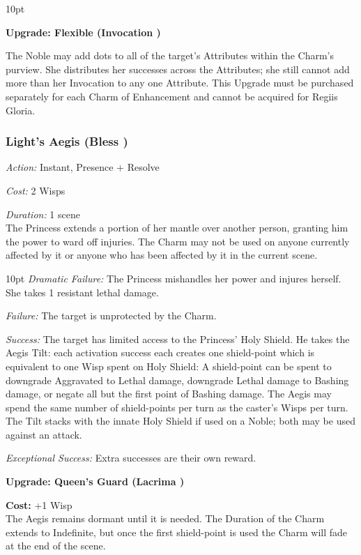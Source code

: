 \begin{myindentpar}{10pt} 

\textbf{Upgrade: Flexible (Invocation \textbullet\textbullet\textbullet)}

The Noble may add dots to all of the target’s Attributes within the Charm's purview. She distributes her successes across the Attributes; she still cannot add more than her Invocation to any one Attribute. This Upgrade must be purchased separately for each Charm of Enhancement and cannot be acquired for Regiis Gloria. 

\end{myindentpar}

\subsubsection*{Light’s Aegis (Bless \textbullet\textbullet\textbullet)}

\emph{Action:} Instant, Presence + Resolve

\emph{Cost:} 2 Wisps

\emph{Duration:} 1 scene \\

\noindent The Princess extends a portion of her mantle over another person, granting him the power to ward off injuries. The Charm may not be used on anyone currently affected by it or anyone who has been affected by it in the current scene. 

\begin{myindentpar}{10pt}    \emph{Dramatic Failure:} The Princess mishandles her power and injures herself. She takes 1 resistant lethal damage.

\emph{Failure:} The target is unprotected by the Charm. 

\emph{Success:} The target has limited access to the Princess’ Holy Shield. He takes the Aegis Tilt: each activation success each creates one shield-point which is equivalent to one Wisp spent on Holy Shield: A shield-point can be spent to downgrade Aggravated to Lethal damage, downgrade Lethal damage to Bashing damage, or negate all but the first point of Bashing damage. The Aegis may spend the same number of shield-points per turn as the caster's Wisps per turn. The Tilt stacks with the innate Holy Shield if used on a Noble; both may be used against an attack. 

\emph{Exceptional Success:} Extra successes are their own reward.

\textbf{Upgrade: Queen's Guard (Lacrima \textbullet\textbullet\textbullet)}

\noindent \textbf{Cost:} +1 Wisp\\

The Aegis remains dormant until it is needed. The Duration of the Charm extends to Indefinite, but once the first shield-point is used the Charm will fade at the end of the scene. 

 \end{myindentpar}

